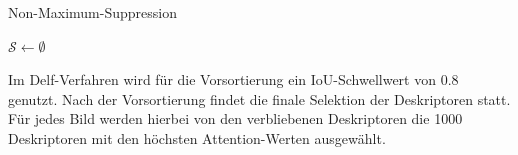 \begin{algorithm}
\caption{Non-Maximum-Suppression}
\label{nms}
\DontPrintSemicolon
{}
$\mathcal{S} \leftarrow \emptyset$ \;

\end{algorithm}
Im Delf-Verfahren wird für die Vorsortierung ein IoU-Schwellwert von $0.8$ genutzt. Nach der Vorsortierung findet die finale Selektion der Deskriptoren statt. Für jedes Bild werden hierbei von den verbliebenen Deskriptoren die 1000 Deskriptoren mit den höchsten Attention-Werten ausgewählt.